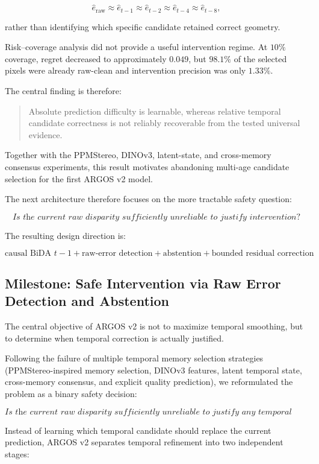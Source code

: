 \documentclass[11pt,a4paper]{article}
\begin{document}
\[
\hat e_{\mathrm{raw}}
\approx
\hat e_{t-1}
\approx
\hat e_{t-2}
\approx
\hat e_{t-4}
\approx
\hat e_{t-8},
\]

rather than identifying which specific candidate retained correct geometry.

Risk--coverage analysis did not provide a useful intervention regime. At \(10\%\) coverage, regret decreased to approximately \(0.049\), but \(98.1\%\) of the selected pixels were already raw-clean and intervention precision was only \(1.33\%\).

The central finding is therefore:

\begin{quote}
Absolute prediction difficulty is learnable, whereas relative temporal candidate correctness is not reliably recoverable from the tested universal evidence.
\end{quote}

Together with the PPMStereo, DINOv3, latent-state, and cross-memory consensus experiments, this result motivates abandoning multi-age candidate selection for the first ARGOS v2 model.

The next architecture therefore focuses on the more tractable safety question:

\[
\textit{Is the current raw disparity sufficiently unreliable to justify intervention?}
\]

The resulting design direction is:

\[
\boxed{
\text{causal BiDA }t-1
+
\text{raw-error detection}
+
\text{abstention}
+
\text{bounded residual correction}
}
\]

\subsection{Milestone: Safe Intervention via Raw Error Detection and Abstention}

The central objective of ARGOS v2 is not to maximize temporal smoothing, but to determine when temporal correction is actually justified.

Following the failure of multiple temporal memory selection strategies (PPMStereo-inspired memory selection, DINOv3 features, latent temporal state, cross-memory consensus, and explicit quality prediction), we reformulated the problem as a binary safety decision:

\[
\textit{Is the current raw disparity sufficiently unreliable to justify any temporal correction?}
\]

Instead of learning which temporal candidate should replace the current prediction, ARGOS v2 separates temporal refinement into two independent stages:
\end{document}
